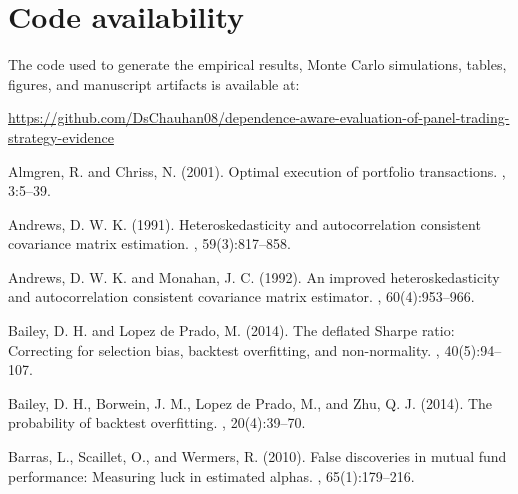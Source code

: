 \documentclass[12pt,a4paper]{article}
\newif\ifblinded
\begin{document}
\section*{Code availability}

The code used to generate the empirical results, Monte Carlo simulations,
tables, figures, and manuscript artifacts is available at:
\ifblinded
{\scriptsize\noindent Repository link omitted from the review manuscript
to preserve double-blind anonymity; it is supplied in the separate title
page and submission metadata.\par}
\else
{\scriptsize\noindent
\url{https://github.com/DsChauhan08/dependence-aware-evaluation-of-panel-trading-strategy-evidence}\par}
\fi


\begin{thebibliography}{99}

Almgren, R. and Chriss, N. (2001).
\newblock Optimal execution of portfolio transactions.
, 3:5--39.

Andrews, D. W. K. (1991).
\newblock Heteroskedasticity and autocorrelation consistent covariance matrix estimation.
, 59(3):817--858.

Andrews, D. W. K. and Monahan, J. C. (1992).
\newblock An improved heteroskedasticity and autocorrelation consistent covariance matrix estimator.
, 60(4):953--966.

Bailey, D. H. and Lopez de Prado, M. (2014).
\newblock The deflated Sharpe ratio: Correcting for selection bias, backtest overfitting, and non-normality.
, 40(5):94--107.

Bailey, D. H., Borwein, J. M., Lopez de Prado, M., and Zhu, Q. J. (2014).
\newblock The probability of backtest overfitting.
, 20(4):39--70.

Barras, L., Scaillet, O., and Wermers, R. (2010).
\newblock False discoveries in mutual fund performance: Measuring luck in estimated alphas.
, 65(1):179--216.


\end{thebibliography}
\end{document}
